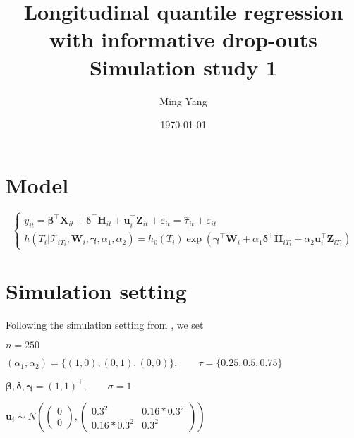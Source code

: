 \documentclass{article}
\begin{document}
\title{\textsf{Longitudinal quantile regression with informative drop-outs\\ Simulation study 1}}
\author{\textsf{Ming Yang}}
\date{\today}
\maketitle

\section{Model}

\begin{equation}\label{eqn:joint}
\left\{
\begin{array}{l}
y_{it} = \boldsymbol{\beta}^{\top}{\boldsymbol X}_{it} + \boldsymbol{\delta}^{\top}{\boldsymbol H}_{it} + {\boldsymbol u}_i^{\top}{\boldsymbol Z}_{it} + \varepsilon_{it} =\overset{\sim}{\tau}_{it} + \varepsilon_{it}\\
h(T_i|\mathcal{T}_{iT_i}, {\boldsymbol W}_i;  \boldsymbol{\gamma}, \alpha_1, 
\alpha_2) = h_0(T_i)\exp(\boldsymbol{\gamma}^{\top}{\boldsymbol W}_i + \alpha_1\boldsymbol{\delta}^{\top}{\boldsymbol H}_{iT_i} + \alpha_2{\boldsymbol u}_i^{\top}{\boldsymbol Z}_{iT_i})
\end{array}
\right.
\end{equation}


\section{Simulation setting }
Following the simulation setting from \cite{farcomeni2014longitudinal}, we set\par

$n=250$\par
$(\alpha_1, \alpha_2)=\{(1, 0), (0, 1), (0, 0)\}, \hspace{2em}\tau=\{0.25, 0.5, 0.75\}$\par
$\boldsymbol{\beta, \delta, \gamma}=(1, 1)^{\top}, \hspace{2em} \sigma=1$\par
$\boldsymbol{u}_i\sim N\left(\begin{pmatrix} 0\\ 0\end{pmatrix}, \begin{pmatrix}0.3^2 & 0.16*0.3^2\\ 0.16*0.3^2 & 0.3^2\end{pmatrix} \right)$\par
\end{document}
